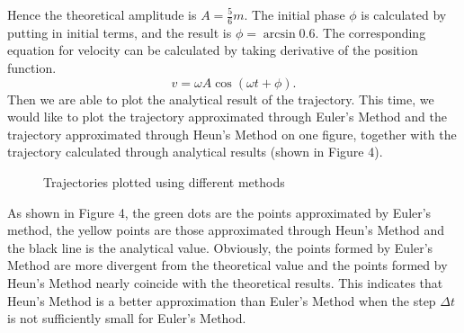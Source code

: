 \documentclass[12pt]{report}
\begin{document}
Hence the theoretical amplitude is $A=\frac{5}{6}m$. The initial phase $\phi$ is calculated by putting in initial terms, and the result is $\phi=\arcsin0.6$. The corresponding equation for velocity can be calculated by taking derivative of the position function.
\begin{equation}
	v=\omega A\cos(\omega t+\phi).
\end{equation}
Then we are able to plot the analytical result of the trajectory. This time, we would like to plot the trajectory approximated through Euler's Method and the trajectory approximated through Heun's Method on one figure, together with the trajectory calculated through analytical results (shown in Figure 4).
\newpage
\begin{figure}[htbp]
\centering
{}
\caption{Trajectories plotted using different methods}
\end{figure}
As shown in Figure 4, the green dots are the points approximated by Euler's method, the yellow points are those approximated through Heun's Method and the black line is the analytical value. Obviously, the points formed by Euler's Method are more divergent from the theoretical value and the points formed by Heun's Method nearly coincide with the theoretical results. This indicates that Heun's Method is a better approximation than Euler's Method when the step $\Delta t$ is not sufficiently small for Euler's Method.
\end{document}
